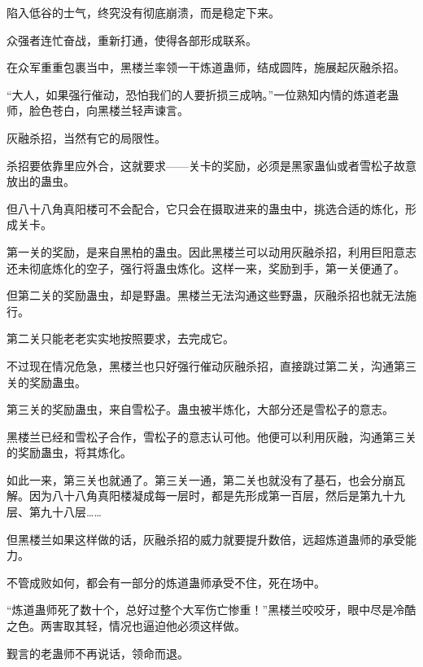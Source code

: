 \begin{this_body}
陷入低谷的士气，终究没有彻底崩溃，而是稳定下来。

众强者连忙奋战，重新打通，使得各部形成联系。

在众军重重包裹当中，黑楼兰率领一干炼道蛊师，结成圆阵，施展起灰融杀招。

“大人，如果强行催动，恐怕我们的人要折损三成呐。”一位熟知内情的炼道老蛊师，脸色苍白，向黑楼兰轻声谏言。

灰融杀招，当然有它的局限性。

杀招要依靠里应外合，这就要求——关卡的奖励，必须是黑家蛊仙或者雪松子故意放出的蛊虫。

但八十八角真阳楼可不会配合，它只会在摄取进来的蛊虫中，挑选合适的炼化，形成关卡。

第一关的奖励，是来自黑柏的蛊虫。因此黑楼兰可以动用灰融杀招，利用巨阳意志还未彻底炼化的空子，强行将蛊虫炼化。这样一来，奖励到手，第一关便通了。

但第二关的奖励蛊虫，却是野蛊。黑楼兰无法沟通这些野蛊，灰融杀招也就无法施行。

第二关只能老老实实地按照要求，去完成它。

不过现在情况危急，黑楼兰也只好强行催动灰融杀招，直接跳过第二关，沟通第三关的奖励蛊虫。

第三关的奖励蛊虫，来自雪松子。蛊虫被半炼化，大部分还是雪松子的意志。

黑楼兰已经和雪松子合作，雪松子的意志认可他。他便可以利用灰融，沟通第三关的奖励蛊虫，将其炼化。

如此一来，第三关也就通了。第三关一通，第二关也就没有了基石，也会分崩瓦解。因为八十八角真阳楼凝成每一层时，都是先形成第一百层，然后是第九十九层、第九十八层……

但黑楼兰如果这样做的话，灰融杀招的威力就要提升数倍，远超炼道蛊师的承受能力。

不管成败如何，都会有一部分的炼道蛊师承受不住，死在场中。

“炼道蛊师死了数十个，总好过整个大军伤亡惨重！”黑楼兰咬咬牙，眼中尽是冷酷之色。两害取其轻，情况也逼迫他必须这样做。

觐言的老蛊师不再说话，领命而退。

\end{this_body}

